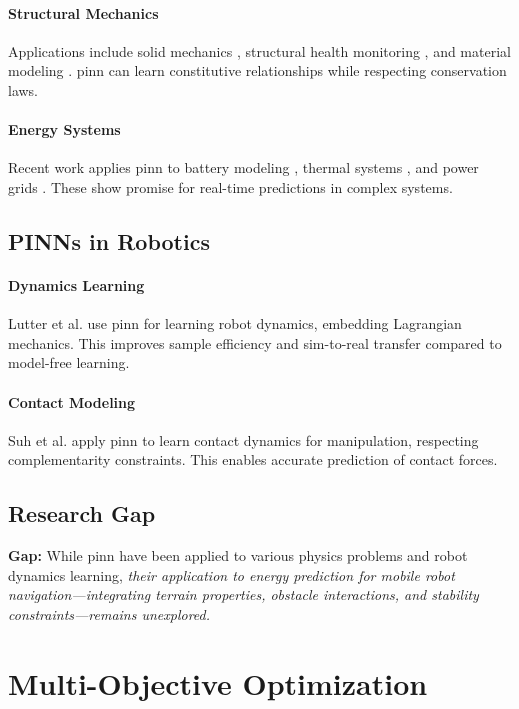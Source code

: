 \paragraph{Structural Mechanics}
Applications include solid mechanics \cite{Haghighat2021}, structural health monitoring \cite{Zhang2020}, and material modeling \cite{Liu2021pinn}. \acrshort{pinn} can learn constitutive relationships while respecting conservation laws.

\paragraph{Energy Systems}
Recent work applies \acrshort{pinn} to battery modeling \cite{Nascimento2021}, thermal systems \cite{Cai2021}, and power grids \cite{Misyris2020}. These show promise for real-time predictions in complex systems.

\subsection{PINNs in Robotics}

\paragraph{Dynamics Learning}
Lutter et al. \cite{Lutter2019} use \acrshort{pinn} for learning robot dynamics, embedding Lagrangian mechanics. This improves sample efficiency and sim-to-real transfer compared to model-free learning.

\paragraph{Contact Modeling}
Suh et al. \cite{Suh2022} apply \acrshort{pinn} to learn contact dynamics for manipulation, respecting complementarity constraints. This enables accurate prediction of contact forces.

\subsection{Research Gap}
\textbf{Gap:} While \acrshort{pinn} have been applied to various physics problems and robot dynamics learning, \textit{their application to energy prediction for mobile robot navigation—integrating terrain properties, obstacle interactions, and stability constraints—remains unexplored.}

\section{Multi-Objective Optimization}
\label{sec:lit_moo}

